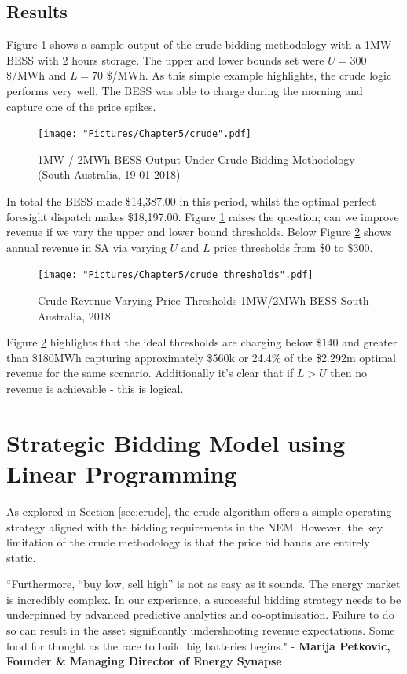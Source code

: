 \subsection{Results}
Figure \ref{fig:crude_sample} shows a sample output of the crude bidding methodology with a 1MW BESS with 2 hours storage. The upper and lower bounds set were $U = 300$ \$/MWh and $L = 70$ \$/MWh. As this simple example highlights, the crude logic performs very well. The BESS was able to charge during the morning and capture one of the price spikes. 
\begin{figure}[H]
    \centering
    \texttt{[image: "Pictures/Chapter5/crude".pdf]}
    \caption{1MW / 2MWh BESS Output Under Crude Bidding Methodology (South Australia, 19-01-2018)}
    \label{fig:crude_sample}
\end{figure}
In total the BESS made \$14,387.00 in this period, whilst the optimal perfect foresight dispatch makes \$18,197.00. Figure \ref{fig:crude_sample} raises the question; can we improve revenue if we vary the upper and lower bound thresholds. Below Figure \ref{fig:crude_thresholds} shows annual revenue in SA via varying $U$ and $L$ price thresholds from \$0 to \$300.
\begin{figure}[H]
    \centering
    \texttt{[image: "Pictures/Chapter5/crude\_thresholds".pdf]}
    \caption{Crude Revenue Varying Price Thresholds 1MW/2MWh BESS
South Australia, 2018}
    \label{fig:crude_thresholds}
\end{figure}
Figure \ref{fig:crude_thresholds} highlights that the ideal thresholds are charging below \$140 and greater than \$180MWh capturing approximately \$560k or 24.4\% of the \$2.292m  optimal revenue for the same scenario. Additionally it's clear that if $L>U$ then no revenue is achievable - this is logical. 
\section{Strategic Bidding Model using Linear Programming}
As explored in Section \ref{sec:crude}, the crude algorithm offers a simple operating strategy aligned with the bidding requirements in the NEM. However, the key limitation of the crude methodology is that the price bid bands are entirely static. 

\begin{tcolorbox}[colback=ocre!5!white,colframe=ocre]
``Furthermore, “buy low, sell high” is not as easy as it sounds. The energy market is incredibly complex. In our experience, a successful bidding strategy needs to be underpinned by advanced predictive analytics and co-optimisation. Failure to do so can result in the asset significantly undershooting revenue expectations. Some food for thought as the race to build big batteries begins." - \textbf{Marija Petkovic, Founder \& Managing Director of Energy Synapse}
\end{tcolorbox}
